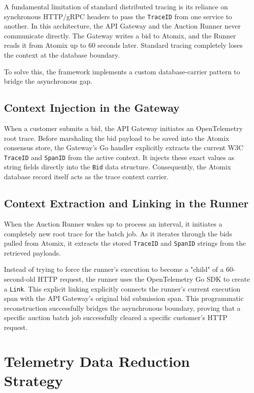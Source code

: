A fundamental limitation of standard distributed tracing is its reliance on synchronous HTTP/gRPC headers to pass the \texttt{TraceID} from one service to another. In this architecture, the API Gateway and the Auction Runner never communicate directly. The Gateway writes a bid to Atomix, and the Runner reads it from Atomix up to 60 seconds later. Standard tracing completely loses the context at the database boundary.

To solve this, the framework implements a custom database-carrier pattern to bridge the asynchronous gap.

\subsection{Context Injection in the Gateway}
When a customer submits a bid, the API Gateway initiates an OpenTelemetry root trace. Before marshaling the bid payload to be saved into the Atomix consensus store, the Gateway's Go handler explicitly extracts the current W3C \texttt{TraceID} and \texttt{SpanID} \cite{opentelemetryDocsContextPropagation} from the active context. It injects these exact values as string fields directly into the \texttt{Bid} data structure. Consequently, the Atomix database record itself acts as the trace context carrier.

\subsection{Context Extraction and Linking in the Runner}
When the Auction Runner wakes up to process an interval, it initiates a completely new root trace for the batch job. As it iterates through the bids pulled from Atomix, it extracts the stored \texttt{TraceID} and \texttt{SpanID} strings from the retrieved payloads.

Instead of trying to force the runner's execution to become a "child" of a 60-second-old HTTP request, the runner uses the OpenTelemetry Go SDK to create a \texttt{Link}. This explicit linking explicitly connects the runner's current execution span with the API Gateway's original bid submission span. This programmatic reconstruction successfully bridges the asynchronous boundary, proving that a specific auction batch job successfully cleared a specific customer's HTTP request.

\section{Telemetry Data Reduction Strategy}

